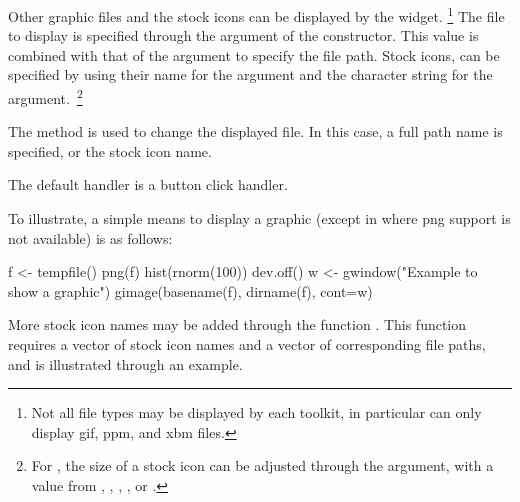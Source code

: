 Other graphic files and the stock icons can be displayed by the
 widget. \footnote{Not all file types may be
  displayed by each toolkit, in particular  can
  only display gif, ppm, and xbm files.} The file to display is
specified through the  argument of the
constructor. This value is combined with that of the
 argument to specify the file path.  Stock
icons, can be specified by using their name for the 
argument and the character string  for the
 argument.~\footnote{For , the size
  of a stock icon can be adjusted through the 
  argument, with a value from , ,
  , , or .}

The  method is used to change the
displayed file. In this case, a full path name is specified, or the
stock icon name.

The default handler is a button click handler.


To illustrate, a simple means to display a graphic (except in
 where png support is not available) is
as follows:
\begin{Schunk}
\begin{Sinput}
 f <- tempfile()
 png(f)
 hist(rnorm(100))
 dev.off()
 w <- gwindow("Example to show a graphic")
 gimage(basename(f), dirname(f), cont=w)
\end{Sinput}
\end{Schunk}


More stock icon names may be added through the function
. This function requires a vector of stock icon
names and a vector of corresponding file paths, and is illustrated
through an example.


